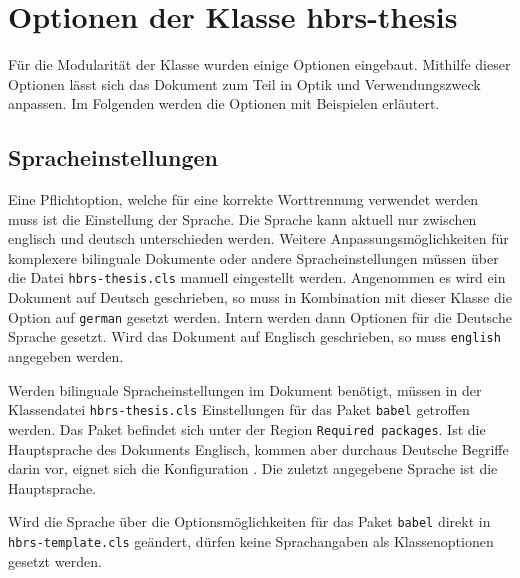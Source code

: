 \chapter{Optionen der Klasse hbrs-thesis}
\label{chap:klassenoptionen}
Für die Modularität der Klasse wurden einige Optionen eingebaut. Mithilfe dieser Optionen lässt sich das Dokument zum Teil in Optik und Verwendungszweck anpassen. Im Folgenden werden die Optionen mit Beispielen erläutert.

\section{Spracheinstellungen}
Eine Pflichtoption, welche für eine korrekte Worttrennung verwendet werden muss ist die Einstellung der Sprache. Die Sprache kann aktuell nur zwischen englisch und deutsch unterschieden werden. Weitere Anpassungsmöglichkeiten für komplexere bilinguale Dokumente oder andere Spracheinstellungen müssen über die Datei \texttt{hbrs-thesis.cls} manuell eingestellt werden. Angenommen es wird ein Dokument auf Deutsch geschrieben, so muss in Kombination mit dieser Klasse die Option auf \texttt{german} gesetzt werden. Intern werden dann Optionen für die Deutsche Sprache gesetzt. Wird das Dokument auf Englisch geschrieben, so muss \texttt{english} angegeben werden. 


Werden bilinguale Spracheinstellungen im Dokument benötigt, müssen in der Klassendatei \texttt{hbrs-thesis.cls} Einstellungen für das Paket \texttt{babel} getroffen werden. Das Paket befindet sich unter der Region \texttt{Required packages}. Ist die Hauptsprache des Dokuments Englisch, kommen aber durchaus Deutsche Begriffe darin vor, eignet sich die Konfiguration \texttt{}. Die zuletzt angegebene Sprache ist die Hauptsprache.

\begin{information}
    Wird die Sprache über die Optionsmöglichkeiten für das Paket \texttt{babel} direkt in \texttt{hbrs-template.cls} geändert, dürfen keine Sprachangaben als Klassenoptionen gesetzt werden.
\end{information}

